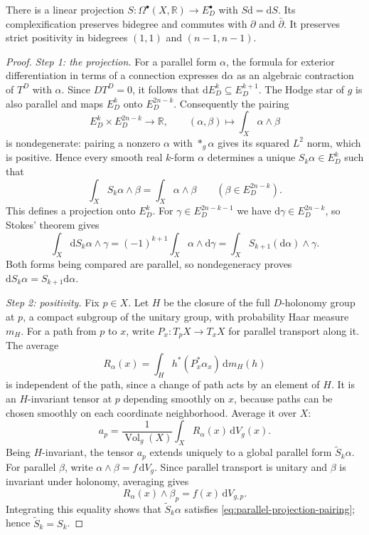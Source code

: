 \begin{lemma}\label{lem:parallel-positive-projection}
There is a linear projection $S\colon\Omega^\bullet(X,\mathbb R)\to E_D^\bullet$ with $S\mathrm d=\mathrm dS$. Its complexification preserves bidegree and commutes with $\partial$ and $\bar\partial$. It preserves strict positivity in bidegrees $(1,1)$ and $(n-1,n-1)$.
\end{lemma}
\begin{proof}
\emph{Step 1: the projection.} For a parallel form $\alpha$, the formula for exterior differentiation in terms of a connection expresses $\mathrm d\alpha$ as an algebraic contraction of $T^D$ with $\alpha$. Since $DT^D=0$, it follows that $\mathrm dE_D^k\subseteq E_D^{k+1}$. The Hodge star of $g$ is also parallel and maps $E_D^k$ onto $E_D^{2n-k}$. Consequently the pairing
\[
 E_D^k\times E_D^{2n-k}\longrightarrow\mathbb R,
 \qquad (\alpha,\beta)\longmapsto\int_X\alpha\wedge\beta
\]
is nondegenerate: pairing a nonzero $\alpha$ with $*_g\alpha$ gives its squared $L^2$ norm, which is positive. Hence every smooth real $k$-form $\alpha$ determines a unique $S_k\alpha\in E_D^k$ such that
\begin{equation}\label{eq:parallel-projection-pairing}
 \int_X S_k\alpha\wedge\beta=\int_X\alpha\wedge\beta
 \qquad(\beta\in E_D^{2n-k}).
\end{equation}
This defines a projection onto $E_D^k$. For $\gamma\in E_D^{2n-k-1}$ we have $\mathrm d\gamma\in E_D^{2n-k}$, so Stokes' theorem gives
\[
 \int_X\mathrm dS_k\alpha\wedge\gamma
 =(-1)^{k+1}\int_X\alpha\wedge\mathrm d\gamma
 =\int_X S_{k+1}(\mathrm d\alpha)\wedge\gamma.
\]
Both forms being compared are parallel, so nondegeneracy proves $\mathrm dS_k\alpha=S_{k+1}\mathrm d\alpha$.

\emph{Step 2: positivity.} Fix $p\in X$. Let $H$ be the closure of the full $D$-holonomy group at $p$, a compact subgroup of the unitary group, with probability Haar measure $m_H$. For a path from $p$ to $x$, write $P_x\colon T_pX\to T_xX$ for parallel transport along it. The average
\[
 R_\alpha(x)=\int_H h^*(P_x^*\alpha_x)\,\mathrm dm_H(h)
\]
is independent of the path, since a change of path acts by an element of $H$. It is an $H$-invariant tensor at $p$ depending smoothly on $x$, because paths can be chosen smoothly on each coordinate neighborhood. Average it over $X$:
\[
 a_p=\frac1{\operatorname{Vol}_g(X)}
                \int_X R_\alpha(x)\,\mathrm dV_g(x).
\]
Being $H$-invariant, the tensor $a_p$ extends uniquely to a global parallel form $\widetilde S_k\alpha$. For parallel $\beta$, write $\alpha\wedge\beta=f\,\mathrm dV_g$. Since parallel transport is unitary and $\beta$ is invariant under holonomy, averaging gives
\[
 R_\alpha(x)\wedge\beta_p=f(x)\,\mathrm dV_{g,p}.
\]
Integrating this equality shows that $\widetilde S_k\alpha$ satisfies \eqref{eq:parallel-projection-pairing}; hence $\widetilde S_k=S_k$.


\end{proof}
